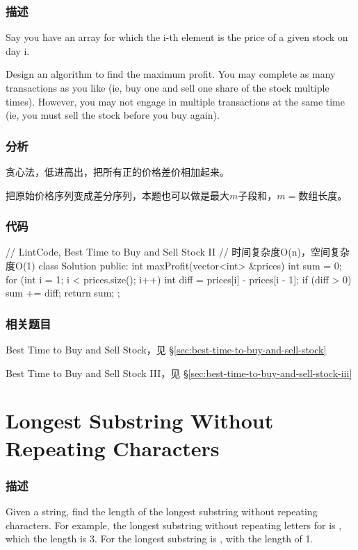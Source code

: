 \subsubsection{描述}
Say you have an array for which the i-th element is the price of a given stock on day i.

Design an algorithm to find the maximum profit. You may complete as many transactions as you like (ie, buy one and sell one share of the stock multiple times). However, you may not engage in multiple transactions at the same time (ie, you must sell the stock before you buy again).


\subsubsection{分析}
贪心法，低进高出，把所有正的价格差价相加起来。

把原始价格序列变成差分序列，本题也可以做是最大$m$子段和，$m=$数组长度。

\subsubsection{代码}
\begin{Code}
// LintCode, Best Time to Buy and Sell Stock II
// 时间复杂度O(n)，空间复杂度O(1)
class Solution {
public:
    int maxProfit(vector<int> &prices) {
        int sum = 0;
        for (int i = 1; i < prices.size(); i++) {
            int diff = prices[i] - prices[i - 1];
            if (diff > 0) sum += diff;
        }
        return sum;
    }
};
\end{Code}


\subsubsection{相关题目}
\begindot
\item Best Time to Buy and Sell Stock，见 \S \ref{sec:best-time-to-buy-and-sell-stock}
\item Best Time to Buy and Sell Stock III，见 \S \ref{sec:best-time-to-buy-and-sell-stock-iii}
\myenddot


\section{Longest Substring Without Repeating Characters} %
\label{sec:longest-substring-without-repeating-characters}


\subsubsection{描述}
Given a string, find the length of the longest substring without repeating characters. For example, the longest substring without repeating letters for  is , which the length is 3. For  the longest substring is , with the length of 1.


